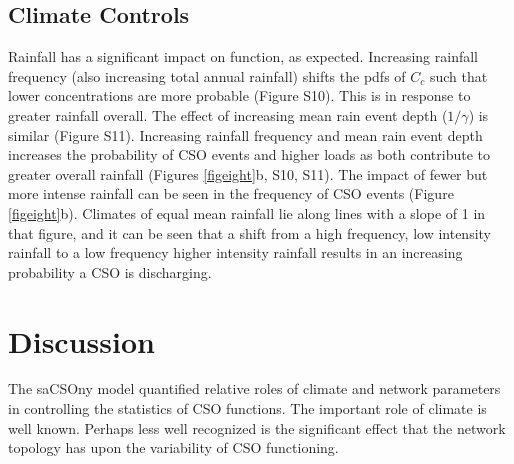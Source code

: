 \documentclass[draft,linenumbers]{agujournal2018}
\begin{document}
 \subsection{Climate Controls}
Rainfall has a signif\/icant impact on function, as expected. Increasing rainfall frequency (also increasing total annual rainfall) shifts the pdfs of $C_c$ such that lower concentrations are more probable (Figure S10). This is in response to greater rainfall overall. The ef\/fect of increasing mean rain event depth ($1/\gamma$) is similar (Figure S11). Increasing rainfall frequency and mean rain event depth increases the probability of CSO events and higher loads as both contribute to greater overall rainfall (Figures \ref{figeight}b, S10, S11). The impact of fewer but more intense rainfall can be seen in the frequency of CSO events (Figure \ref{figeight}b). Climates of equal mean rainfall lie along lines with a slope of 1 in that f\/igure, and it can be seen that a shift from a high frequency, low intensity rainfall to a low frequency higher intensity rainfall results in an increasing probability a CSO is discharging.


\section{Discussion}
The saCSOny model quantif\/ied relative roles of climate and network parameters in controlling the statistics of CSO functions. The important role of climate is well known. Perhaps less well recognized is the signif\/icant ef\/fect that the network topology has upon the variability of CSO functioning.
\end{document}
